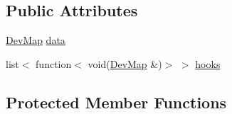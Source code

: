 \subsection*{Public Attributes}
\begin{DoxyCompactItemize}
\item 
\mbox{\hyperlink{Perif_8hpp_a358ff4ee6d24694ee7661f0cce14377e}{Dev\+Map}} \mbox{\hyperlink{classperif_1_1PerifBase_a1a3afaa535fda17e9f97123fffe78765}{data}}
\item 
list$<$ function$<$ void(\mbox{\hyperlink{Perif_8hpp_a358ff4ee6d24694ee7661f0cce14377e}{Dev\+Map}} \&)$>$ $>$ \mbox{\hyperlink{classperif_1_1PerifBase_a98964e5ca8384df64881265e0aa6d7b6}{hooks}}
\end{DoxyCompactItemize}
\subsection*{Protected Member Functions}
